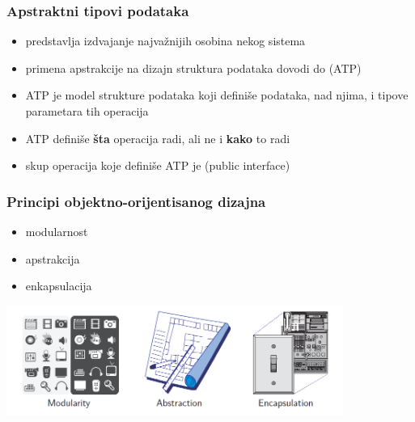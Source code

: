 \documentclass[compress]{beamer}
\begin{document}
\begin{frame}[fragile]
  \frametitle{Apstraktni tipovi podataka}
  \begin{itemize}
    \item {} predstavlja izdvajanje najvažnijih osobina nekog sistema
    \item primena apstrakcije na dizajn struktura podataka dovodi do  (ATP)
    \item ATP je model strukture podataka koji definiše  podataka,  nad njima, i tipove parametara tih operacija
    \item ATP definiše \textbf{šta} operacija radi, ali ne i \textbf{kako} to radi
    \item skup operacija koje definiše ATP je  (public interface)
  \end{itemize}
\end{frame}

\begin{frame}[fragile]
  \frametitle{Principi objektno-orijentisanog dizajna}
  \begin{itemize}
    \item modularnost
    \item apstrakcija
    \item enkapsulacija
  \end{itemize}
  \begin{center}
    \includegraphics[width=11cm]{asp-03-pic01.png}
  \end{center}
\end{frame}
\end{document}
